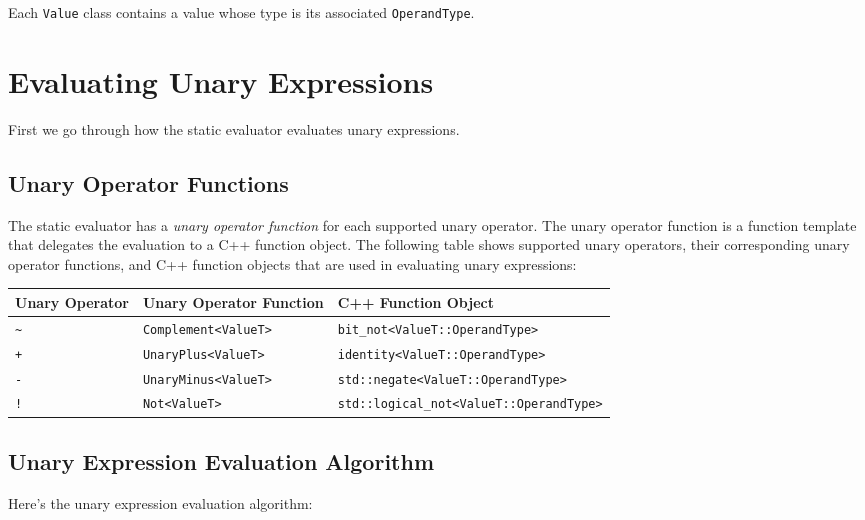 \documentclass[a4paper,oneside,11pt]{book}
\theoremstyle{definition}
\begin{document}
Each \verb|Value| class contains a value whose type is its associated \verb|OperandType|.

\section{Evaluating Unary Expressions}

First we go through how the static evaluator evaluates unary expressions.

\subsection{Unary Operator Functions}

The static evaluator has a \emph{unary operator function} for each supported unary operator.
The unary operator function is a function template that delegates the evaluation to a C++ function object.
The following table shows supported unary operators, their corresponding unary operator functions, and
C++ function objects that are used in evaluating unary expressions:

\begin{flushleft}
\begin{supertabular}{lll}
\textbf{Unary Operator}& \textbf{Unary Operator Function}& \textbf{C++ Function Object}\\
\hline
\verb|~|& \verb|Complement<ValueT>|& \verb|bit_not<ValueT::OperandType>|\\
\verb|+|& \verb|UnaryPlus<ValueT>|& \verb|identity<ValueT::OperandType>|\\
\verb|-|& \verb|UnaryMinus<ValueT>|& \verb|std::negate<ValueT::OperandType>|\\
\verb|!|& \verb|Not<ValueT>|& \verb|std::logical_not<ValueT::OperandType>|\\
\hline
\end{supertabular}
\end{flushleft}

\clearpage
\subsection{Unary Expression Evaluation Algorithm}

Here's the unary expression evaluation algorithm:
\end{document}
